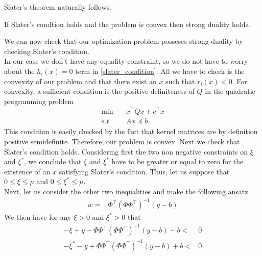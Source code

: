 Slater's theorem naturally follows.
\begin{theorem}
    If Slater's condtion holds and the problem is convex then strong duality holds.
\end{theorem}
We can now check that our optimization problem posseses strong duality by checking Slater's condition.
\\
In our case we don't have any equality constraint, so we do not have to worry about the $h_i(x)=0$ term in \ref{slater_condition}. All we have to check is the convexity of our problem and that there exist an $x$ such that $r_i(x)<0$.
For convexity, a sufficient condition is the positive definiteness of $Q$ in the quadratic programming problem 
\begin{equation}
    \begin{aligned}
        \min \quad & x^\intercal Q x+ c^\intercal x \\        
        s.t \quad& Ax\preceq b
    \end{aligned}
\end{equation}
This condition is easily checked by the fact that kernel matrices are by definition positive semidefinite.
Therefore, our problem is convex.
Next we check that Slater's condition holds. Considering first the two non negative constraints on $\xi$ and $\xi^*$, we conclude that $\xi$  and $\xi^*$ have to be greater or equal to zero for the existence of an $x$ satisfying Slater's condition. Thus, let us suppose that $0 \leq \xi \leq \mu$ and $0 \leq \xi^* \leq \mu$.
\\
Next, let us consider the other two inequalities and make the following ansatz.
\\
\begin{equation}
    \begin{aligned}
        w=& \Phi^\intercal(\Phi \Phi^\intercal)^{-1} (y-b)
    \end{aligned}
\end{equation}
We then have for any $\xi > 0$ and $\xi^* > 0$  that
\begin{equation}
    \begin{aligned}
        -\xi + y -\Phi\Phi^\intercal(\Phi \Phi^\intercal)^{-1}(y-b)-b<&0
        \\
        -\xi^* - y +\Phi\Phi^\intercal(\Phi \Phi^\intercal)^{-1}(y-b)+b<&0
    \end{aligned}
\end{equation}
